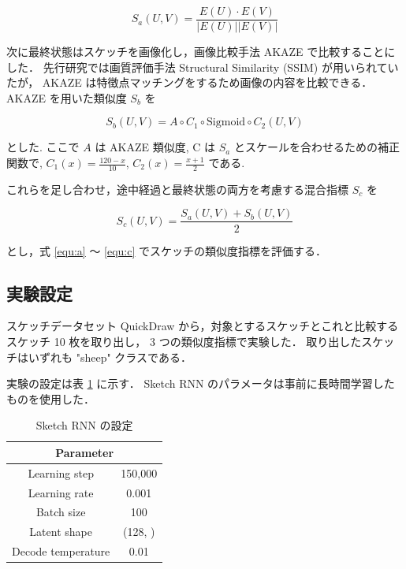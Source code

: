 \documentclass[twocolumn]{jarticle}     %
\begin{document}
\begin{equation}
  \label{equ:a}
  S_a(U, V) = \frac{E(U) \cdot E(V)}{|E(U)| |E(V)|}
\end{equation}


次に最終状態はスケッチを画像化し，画像比較手法 AKAZE で比較することにした．
先行研究では画質評価手法 Structural Similarity (SSIM) が用いられていたが，
AKAZE は特徴点マッチングをするため画像の内容を比較できる．
AKAZE を用いた類似度 $S_b$ を

\begin{equation}
  \label{equ:b}
  S_b(U, V) = A \circ C_1 \circ \mathrm{Sigmoid} \circ C_2 (U, V)
\end{equation}

とした.
ここで $A$ は AKAZE 類似度, C は $S_a$ とスケールを合わせるための補正関数で, $C_1(x) = \frac{120 - x}{10}$, $C_2(x) = \frac{x + 1}{2}$ である.


これらを足し合わせ，途中経過と最終状態の両方を考慮する混合指標 $S_c$ を

\begin{equation}
  \label{equ:c}
  S_c(U, V) = \frac{S_a(U, V) + S_b(U, V)}{2}
\end{equation}

とし，式 \ref{equ:a} ～ \ref{equ:c} でスケッチの類似度指標を評価する．

\subsection{実験設定}
スケッチデータセット QuickDraw から，対象とするスケッチとこれと比較するスケッチ 10 枚を取り出し，
3 つの類似度指標で実験した．
取り出したスケッチはいずれも "sheep" クラスである．

実験の設定は表 \ref{tab:setting1} に示す．
Sketch RNN のパラメータは事前に長時間学習したものを使用した．

\begin{table}[tb]
  \begin{center}
    \caption{Sketch RNN の設定}
    \begin{tabular}{cc} \hline
      \multicolumn{2}{c}{Parameter}  \\ \hline
      Learning step & 150,000 \\
      Learning rate & 0.001 \\
      Batch size & 100 \\
      Latent shape & (128, ) \\
      Decode temperature & 0.01 \\ \hline
    \end{tabular}
    \label{tab:setting1}
  \end{center}
\end{table}
\end{document}

